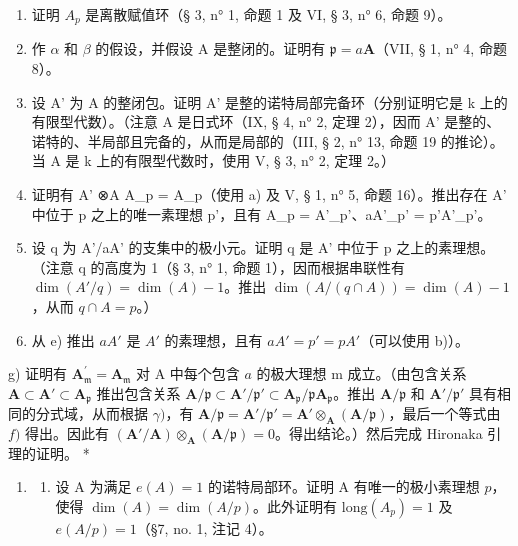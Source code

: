 \begin{enumerate}
\def\labelenumi{\alph{enumi})}
\item
  证明 \(A_p\) 是离散赋值环（§ 3, n° 1, 命题 1 及 VI, § 3, n° 6, 命题 9）。
\item
  作 \(\alpha\) 和 \(\beta\) 的假设，并假设 A 是整闭的。证明有 \(\mathfrak{p} = a\mathbf{A}\)（VII, § 1, n° 4, 命题 8）。
\item
  设 A' 为 A 的整闭包。证明 A' 是整的诺特局部完备环（分别证明它是 k 上的有限型代数）。（注意 A 是日式环（IX, § 4, n° 2, 定理 2），因而 A' 是整的、诺特的、半局部且完备的，从而是局部的（III, § 2, n° 13, 命题 19 的推论）。当 A 是 k 上的有限型代数时，使用 V, § 3, n° 2, 定理 2。）
\item
  证明有 A' ⊗A A\_p = A\_p（使用 a) 及 V, § 1, n° 5, 命题 16）。推出存在 A' 中位于 p 之上的唯一素理想 p'，且有 A\_p = A'\_p'、aA'\_p' = p'A'\_p'。
\item
  设 q 为 A'/aA' 的支集中的极小元。证明 q 是 A' 中位于 p 之上的素理想。（注意 q 的高度为 1（§ 3, n° 1, 命题 1），因而根据串联性有 \(\dim(A'/q)=\dim(A)-1\)。推出 \(\dim(A/(q \cap A))=\dim(A)-1\)，从而 \(q \cap A = p\)。）
\item
  从 e) 推出 \(aA'\) 是 \(A'\) 的素理想，且有 \(aA' = p' = pA'\)（可以使用 b)）。
\end{enumerate}

g) 证明有 \(\mathbf{A}_{\mathfrak{m}}^{\prime} = \mathbf{A}_{\mathfrak{m}}\) 对 A 中每个包含 \(a\) 的极大理想 m 成立。（由包含关系 \(\mathbf{A} \subset \mathbf{A}' \subset \mathbf{A}_{\mathfrak{p}}\) 推出包含关系 \(\mathbf{A}/\mathfrak{p} \subset \mathbf{A}'/\mathfrak{p}' \subset \mathbf{A}_{\mathfrak{p}}/\mathfrak{p}\mathbf{A}_{\mathfrak{p}}\)。推出 \(\mathbf{A}/\mathfrak{p}\) 和 \(\mathbf{A}'/\mathfrak{p}'\) 具有相同的分式域，从而根据 \(\gamma)\)，有 \(\mathbf{A}/\mathfrak{p} = \mathbf{A}'/\mathfrak{p}' = \mathbf{A}' \otimes_{\mathbf{A}} (\mathbf{A}/\mathfrak{p})\)，最后一个等式由 \(f)\) 得出。因此有 \((\mathbf{A}'/\mathbf{A}) \otimes_{\mathbf{A}} (\mathbf{A}/\mathfrak{p}) = 0\)。得出结论。）然后完成 Hironaka 引理的证明。 *

\begin{enumerate}
\def\labelenumi{\arabic{enumi})}
\setcounter{enumi}{22}
\tightlist
\item
  \begin{enumerate}
  \def\labelenumii{\alph{enumii})}
  \tightlist
  \item
    设 A 为满足 \(e(A) = 1\) 的诺特局部环。证明 A 有唯一的极小素理想 \(p\)，使得 \(\dim(A) = \dim(A/p)\)。此外证明有 \(\text{long}(A_p) = 1\) 及 \(e(A/p) = 1\)（\S 7, no. 1, 注记 4）。
  \end{enumerate}
\end{enumerate}

